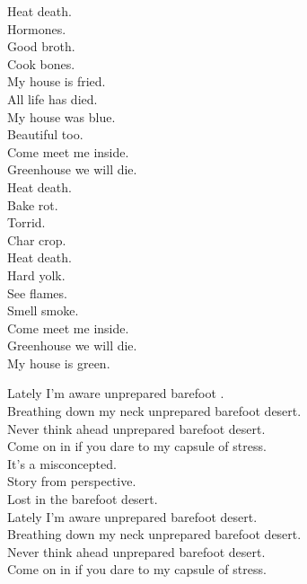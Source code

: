 Heat death. \\
Hormones. \\
Good broth. \\
Cook bones. \\

My house is fried. \\
All life has died. \\
My house was blue. \\
Beautiful too. \\

Come meet me inside. \\
Greenhouse we will die. \\

Heat death. \\
Bake rot. \\
Torrid. \\
Char crop. \\
Heat death. \\
Hard yolk. \\
See flames. \\
Smell smoke. \\

Come meet me inside. \\
Greenhouse we will die. \\
My house is green. \\




Lately I'm aware unprepared barefoot . \\
Breathing down my neck unprepared barefoot desert. \\
Never think ahead unprepared barefoot desert. \\
Come on in if you dare to my capsule of stress. \\

It's a misconcepted. \\
Story from perspective. \\
Lost in the barefoot desert. \\

Lately I'm aware unprepared barefoot desert. \\
Breathing down my neck unprepared barefoot desert. \\
Never think ahead unprepared barefoot desert. \\
Come on in if you dare to my capsule of stress. \\

